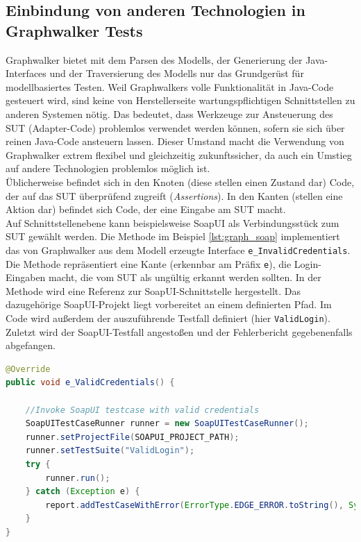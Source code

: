 \subsection{Einbindung von anderen Technologien in Graphwalker Tests}
Graphwalker bietet mit dem Parsen des Modells, der Generierung der Java-Interfaces und der Traversierung des Modells nur das Grundgerüst für modellbasiertes Testen. Weil Graphwalkers volle Funktionalität in Java-Code gesteuert wird, sind keine von Herstellerseite wartungspflichtigen Schnittstellen zu anderen Systemen nötig. Das bedeutet, dass Werkzeuge zur Ansteuerung des \Gls{SUT} (Adapter-Code) problemlos verwendet werden können, sofern sie sich über reinen Java-Code ansteuern lassen. Dieser Umstand macht die Verwendung von Graphwalker extrem flexibel und gleichzeitig zukunftssicher, da auch ein Umstieg auf andere Technologien problemlos möglich ist.\\
Üblicherweise befindet sich in den Knoten (diese stellen einen Zustand dar) Code, der auf das \Gls{SUT} überprüfend zugreift (\textit{Assertions}). In den Kanten (stellen eine Aktion dar) befindet sich Code, der eine Eingabe am \Gls{SUT} macht.\\
Auf Schnittstellenebene kann beispielsweise SoapUI als Verbindungsstück zum \Gls{SUT} gewählt werden. Die Methode im Beispiel \ref{lst:graph_soap} implementiert das von Graphwalker aus dem Modell erzeugte Interface \texttt{e\_InvalidCredentials}. Die Methode repräsentiert eine Kante (erkennbar am Präfix \texttt{e}), die Login-Eingaben macht, die vom \Gls{SUT} als ungültig erkannt werden sollten. In der Methode wird eine Referenz zur SoapUI-Schnittstelle hergestellt. Das dazugehörige SoapUI-Projekt liegt vorbereitet an einem definierten Pfad. Im Code wird außerdem der auszuführende Testfall definiert (hier \texttt{ValidLogin}). Zuletzt wird der SoapUI-Testfall angestoßen und der Fehlerbericht gegebenenfalls abgefangen.

\begin{lstlisting}[language=Java,caption={Eine Methode, die ein von Graphwalker erzeugtes Interface implementiert und einen SoapUI-Testfall anstößt.}, label=lst:graph_soap]
@Override
public void e_ValidCredentials() {

    //Invoke SoapUI testcase with valid credentials
    SoapUITestCaseRunner runner = new SoapUITestCaseRunner();
    runner.setProjectFile(SOAPUI_PROJECT_PATH);
    runner.setTestSuite("ValidLogin");
    try {
        runner.run();
    } catch (Exception e) {
        report.addTestCaseWithError(ErrorType.EDGE_ERROR.toString(), System.currentTimeMillis(), "Error while validating credentials", e.getStackTrace().toString());
    }
}
\end{lstlisting}

